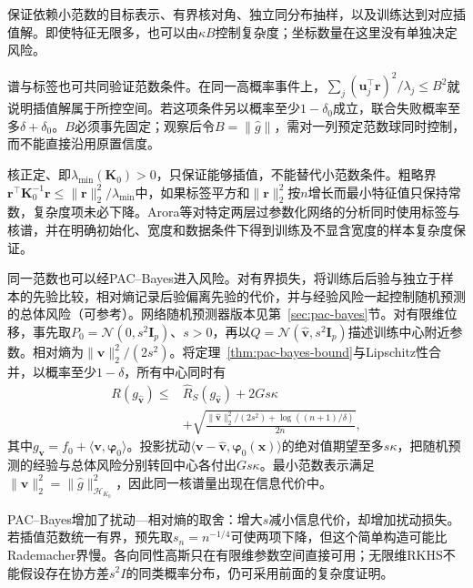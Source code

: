 保证依赖小范数的目标表示、有界核对角、独立同分布抽样，以及训练达到对应插值解。即使特征无限多，也可以由$\kappa B$控制复杂度；坐标数量在这里没有单独决定风险。

谱与标签也可共同验证范数条件。在同一高概率事件上，$\sum_j(\bm u_j^\top\bm r)^2/\lambda_j\leq B^2$就说明插值解属于所控空间。若这项条件另以概率至少$1-\delta_0$成立，联合失败概率至多$\delta+\delta_0$。$B$必须事先固定；观察后令$B=\|\widehat g\|$，需对一列预定范数球同时控制，而不能直接沿用原置信度。

核正定、即$\lambda_{\min}(\bm K_0)>0$，只保证能够插值，不能替代小范数条件。粗略界$\bm r^\top\bm K_0^{-1}\bm r\leq\|\bm r\|_2^2/\lambda_{\min}$中，如果标签平方和$\|\bm r\|_2^2$按$n$增长而最小特征值只保持常数，复杂度项未必下降。Arora等对特定两层过参数化网络的分析同时使用标签与核谱，并在明确初始化、宽度和数据条件下得到训练及不显含宽度的样本复杂度保证。

同一范数也可以经PAC--Bayes进入风险。对有界损失，将训练后后验与独立于样本的先验比较，相对熵记录后验偏离先验的代价，并与经验风险一起控制随机预测的总体风险（可参考）。网络随机预测器版本见第~\ref{sec:pac-bayes}节。对有限维位移，事先取$P_0=\mathcal N(0,s^2\bm I_p)$、$s>0$，再以$Q=\mathcal N(\widehat{\bm v},s^2\bm I_p)$描述训练中心附近参数。相对熵为$\|\widehat{\bm v}\|_2^2/(2s^2)$。将定理~\ref{thm:pac-bayes-bound}与Lipschitz性合并，以概率至少$1-\delta$，所有中心同时有
\begin{equation}
 \begin{aligned}
 R(g_{\widehat{\bm v}})\leq{}&\hat R_S(g_{\widehat{\bm v}})+2Gs\kappa\\
 &+\sqrt{\frac{\|\widehat{\bm v}\|_2^2/(2s^2)+\log((n+1)/\delta)}{2n}},
 \end{aligned}
 \label{eq:ntk-pac-bayes-risk}
\end{equation}
其中$g_{\bm v}=f_0+\langle\bm v,\bm\varphi_0\rangle$。投影扰动$\langle\bm v-\widehat{\bm v},\bm\varphi_0(\bm x)\rangle$的绝对值期望至多$s\kappa$，把随机预测的经验与总体风险分别转回中心各付出$Gs\kappa$。最小范数表示满足$\|\widehat{\bm v}\|_2^2=\|\widehat g\|_{\mathcal H_{K_0}}^2$，因此同一核谱量出现在信息代价中。

PAC--Bayes增加了扰动—相对熵的取舍：增大$s$减小信息代价，却增加扰动损失。若插值范数统一有界，预先取$s_n=n^{-1/4}$可使两项下降，但这个简单构造可能比Rademacher界慢。各向同性高斯只在有限维参数空间直接可用；无限维RKHS不能假设存在协方差$s^2I$的同类概率分布，仍可采用前面的复杂度证明。

